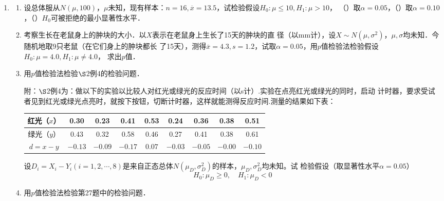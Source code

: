 \begin{enumerate}
    \item \begin{enumerate}
        \item 设总体服从$N(\mu, 100)$，$\mu$未知，现有样本：$n=16,\overline{x}=13.5$，试检验假设$H_0:\mu\leq 10,H_1:\mu>10$，
        （）取$\alpha=0.05$，（）取$\alpha=0.10$，（）$H_0$可被拒绝的最小显著性水平．
        \item 考察生长在老鼠身上的肿块的大小．以$X$表示在老鼠身上生长了15天的肿块的直
        径（以mm计），设$X\sim N(\mu,\sigma^2)$，$\mu,\sigma$均未知．今随机地取9只老鼠（在它们身上的肿块都长
        了15天），测得$\overline{x}=4.3,s=1.2$，试取$\alpha=0.05$，用$p$值检验法检验假设$H_0:\mu=4.0,H_1:\mu\neq 4.0$，
        求出$p$值．
        \item 用$p$值检验法检验$\S$2例4的检验问题．
        
        {\kaishu 附：$\S$2例4为：做以下的实验以比较人对红光或绿光的反应时间（以s计）.实验在点亮红光或绿光的同时，启动
        计时器，要求受试者见到红光或绿光点亮时，就按下按钮，切断计时器，这样就能测得反应时间.测量的结果如下表：
        \renewcommand{\arraystretch}{1.3}
        \begin{table}[H]
        \centering
            \begin{tabular}{c|cccccccc}
            红光（$x$） & 0.30    & 0.23    & 0.41    & 0.53   & 0.24    & 0.36    & 0.38    & 0.51    \\ \hline
            绿光（$y$） & 0.43    & 0.32    & 0.58    & 0.46   & 0.27    & 0.41    & 0.38    & 0.61    \\ \hline
            $d=x-y$ & $-0.13$ & $-0.09$ & $-0.17$ & $0.07$ & $-0.03$ & $-0.05$ & $-0.00$ & $-0.10$
            \end{tabular}
            \end{table}
        \renewcommand{\arraystretch}{1.0}
        设$D_i=X_i-Y_i(i=1,2,\cdots,8)$是来自正态总体$N(\mu_D,\sigma^2_D)$的样本，$\mu_D,\sigma^2_D$均未知。试
        检验假设（取显著性水平$\alpha=0.05$）
        $$H_0:\mu_D\geq 0,\quad H_1:\mu_D<0$$}
        \item 用$p$值检验法检验第27题中的检验问题．
        

\end{enumerate}
\end{enumerate}
